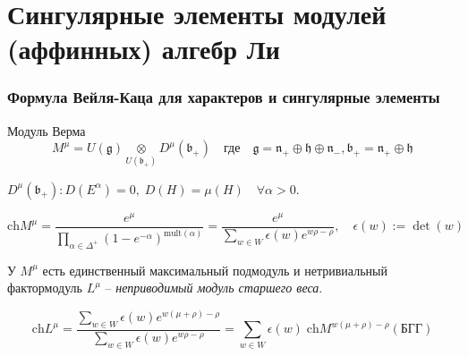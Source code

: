 \documentclass[pdftex]{beamer}
\newcommand{\gf}{\mathfrak{g}}
\newcommand{\bff}{\mathfrak{b}}
\newcommand{\hf}{\mathfrak{h}}
\theoremstyle{definition} \newtheorem{Def}{Определение}
\begin{document}
\section{Сингулярные элементы модулей (аффинных) алгебр Ли}

\begin{frame}
  \frametitle{Формула Вейля-Каца для характеров и сингулярные элементы}

Модуль Верма 
\begin{equation*}
 M^{\mu}=U(\gf)\underset{U(\bff_{+})}{\otimes} D^{\mu}(\bff_{+}) \quad \mbox{где} \quad     \gf=\mathfrak{n}_{+}\oplus \hf \oplus\mathfrak{n}_{-}, \bff_{+}=\mathfrak{n}_{+}\oplus \hf
\end{equation*}

$D^{\mu}(\bff_{+}): D(E^{\alpha})=0,\; D(H)=\mu(H)\quad \forall \alpha>0$.

\begin{equation*}
  \label{eq:11}
  \mathrm{ch} M^{\mu}=\frac{e^{\mu}}{\prod_{\alpha\in \Delta^{+}} \left( 1-e^{-\alpha}\right)^{\mathrm{mult}(\alpha)}}=\frac{e^{\mu}}{\sum_{w\in W} \epsilon(w) e^{w\rho-\rho}}, \quad \epsilon \left( w\right) :=\det \left( w\right)
\end{equation*}
  
У $M^{\mu}$ есть единственный максимальный подмодуль и нетривиальный фактормодуль $L^{\mu}$ -- 
{\it неприводимый модуль старшего веса}. 

\begin{equation*}
  \label{eq:13}
  \mathrm{ch} L^{\mu}=\frac{\sum_{w\in W} \epsilon(w) e^{w(\mu+\rho)-\rho}}{\sum_{w\in W}\epsilon(w) e^{w\rho-\rho}}=\sum_{w\in W} \epsilon(w)\; \mathrm{ch} M^{w(\mu+\rho)-\rho} (\mbox{БГГ})
\end{equation*}

\end{frame}
\end{document}

